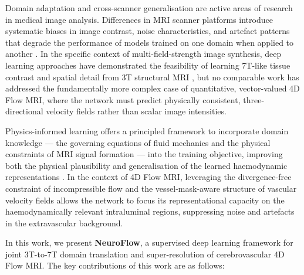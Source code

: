 \documentclass[11pt]{article}
\begin{document}
Domain adaptation and cross-scanner generalisation are active areas of research in medical image analysis. Differences in MRI scanner platforms introduce systematic biases in image contrast, noise characteristics, and artefact patterns that degrade the performance of models trained on one domain when applied to another \cite{glocker2023domain,perone2019transductive}. In the specific context of multi-field-strength image synthesis, deep learning approaches have demonstrated the feasibility of learning 7T-like tissue contrast and spatial detail from 3T structural MRI \cite{qu2020synth7t,cui2024synth7t}, but no comparable work has addressed the fundamentally more complex case of quantitative, vector-valued 4D Flow MRI, where the network must predict physically consistent, three-directional velocity fields rather than scalar image intensities.

Physics-informed learning offers a principled framework to incorporate domain knowledge --- the governing equations of fluid mechanics and the physical constraints of MRI signal formation --- into the training objective, improving both the physical plausibility and generalisation of the learned haemodynamic representations \cite{kissas2020,ayed2023piml}. In the context of 4D Flow MRI, leveraging the divergence-free constraint of incompressible flow and the vessel-mask-aware structure of vascular velocity fields allows the network to focus its representational capacity on the haemodynamically relevant intraluminal regions, suppressing noise and artefacts in the extravascular background.

In this work, we present \textbf{NeuroFlow}, a supervised deep learning framework for joint 3T-to-7T domain translation and super-resolution of cerebrovascular 4D Flow MRI. The key contributions of this work are as follows:
\end{document}
